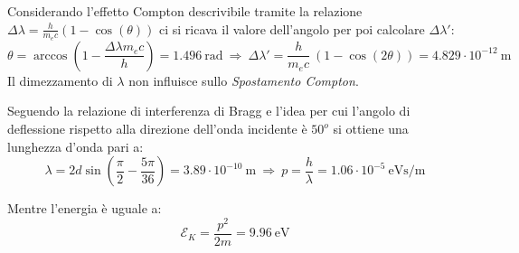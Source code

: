 \documentclass[12pt,twoside,a4]{article}
\begin{document}
\begin{solution}
	Considerando l'effetto Compton descrivibile tramite la relazione $\Delta \lambda = \frac{h}{m_e c } (1-\cos{(\theta)})$ ci si ricava il valore dell'angolo per poi calcolare $\Delta \lambda'$: \begin{equation*}
     \theta = \arccos {\left(1- \frac{\Delta \lambda m_e c}{h}\right)} = 1.496 \ \mathrm{rad}  \  \Rightarrow  \   \Delta \lambda' = \frac{h}{m_e c} \ (1 - \cos{(2\theta)}) = 4.829 \cdot 10^{-12} \ \mathrm{m}   
 \end{equation*}
 Il dimezzamento di $\lambda$ non influisce sullo \textit{Spostamento Compton}.
\end{solution}





\begin{solution}
	Seguendo la relazione di interferenza di Bragg e l'idea per cui l'angolo di deflessione rispetto alla direzione dell'onda incidente è $50^o$ si ottiene una lunghezza d'onda pari a: \begin{equation*}
\lambda = 2 d \sin{\left(\frac{\pi}{2} - \frac{5 \pi}{36}\right)} = 3.89 \cdot 10^{-10} \ \mathrm{m}   \  \Rightarrow  \  p = \frac{h}{\lambda} = 1.06 \cdot 10^{-5} \ \mathrm{eV s/m}  
\end{equation*}

 Mentre l'energia è uguale a: \begin{equation*}
\mathcal{E}_K = \frac{p^2}{2 m} =  9.96 \ \mathrm{eV}    
 \end{equation*}
\end{solution}


\newpage
\end{document}
